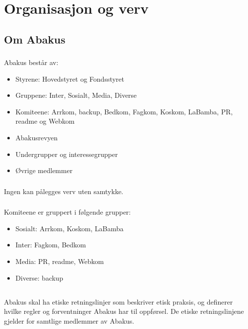 \section{Organisasjon og verv}
\subsection{Om Abakus}

\subsubsection{}
Abakus består av:

\begin{itemize}
\item Styrene: Hovedstyret og Fondsstyret
\item Gruppene: Inter, Sosialt, Media, Diverse
\item Komiteene: Arrkom, backup, Bedkom, Fagkom, Koskom, LaBamba, PR, readme og Webkom
\item Abakusrevyen
\item Undergrupper og interessegrupper
\item Øvrige medlemmer
\end{itemize}

\subsubsection{}
Ingen kan pålegges verv uten samtykke.

\subsubsection{}
Komiteene er gruppert i følgende grupper:

\begin{itemize}
\item Sosialt: Arrkom, Koskom, LaBamba
\item Inter: Fagkom, Bedkom
\item Media: PR, readme, Webkom
\item Diverse: backup
\end{itemize}

\subsection{}
Abakus skal ha etiske retningslinjer som beskriver etisk praksis, og definerer hvilke regler og
forventninger Abakus har til oppførsel. De etiske retningslinjene gjelder for samtlige medlemmer av
Abakus.


